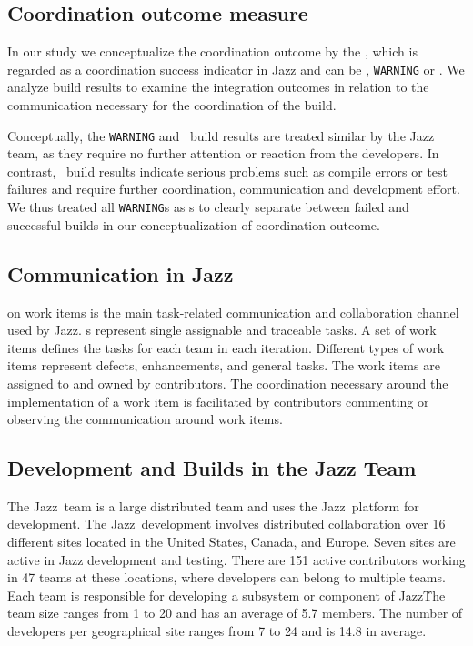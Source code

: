 \subsection{Coordination outcome measure}
In our study we conceptualize the coordination outcome by the ,
which is regarded as a coordination success indicator in Jazz and can be \error,
\texttt{WARNING} or \ok. We analyze build results to examine the integration
outcomes in relation to the communication necessary for the coordination of the
build.

Conceptually, the \texttt{WARNING} and \ok\ build results are treated similar by
the Jazz team, as they require no further attention or reaction from the
developers. In contrast, \error\ build results indicate serious problems such as
compile errors or test failures and require further coordination, communication
and development effort. We thus treated all \texttt{WARNING}s as \ok s to clearly
separate between failed and successful builds in our conceptualization of
coordination outcome.


\subsection{Communication in Jazz}

 on work items is the main task-related communication and
collaboration channel used by Jazz. s represent single assignable
and traceable tasks. A set of work items defines the tasks for each team in each
iteration. Different types of work items represent defects, enhancements, and
general tasks. The work items are assigned to and owned by contributors. The
coordination necessary around the implementation of a work item is facilitated by
contributors commenting or observing the communication around work items.





















\subsection{Development and Builds in the Jazz Team}
The Jazz\tm\ team is a large distributed team and uses the Jazz\tm\ platform for
development. The Jazz\tm\ development involves distributed collaboration over 16
different sites located in the United States, Canada, and Europe. Seven sites are
active in Jazz development and testing. There are 151 active contributors
working in 47 teams at these locations, where developers can belong to multiple
teams. Each team is responsible for developing a subsystem or component of Jazz\tm\.
The team size ranges from 1 to 20 and has an average of 5.7 members. The number
of developers per geographical site ranges from 7 to 24 and is 14.8 in average.


